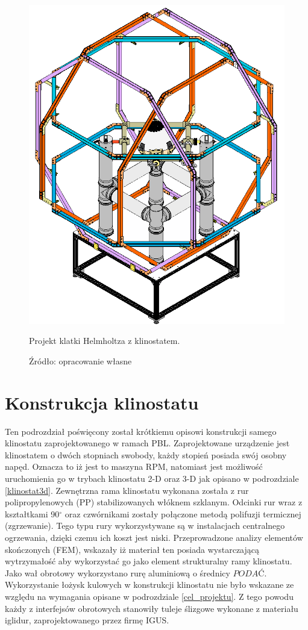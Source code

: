\begin{figure}
	\centering
	\includegraphics[scale=0.5]{klinostat_klatka}
	\caption{Projekt klatki Helmholtza z klinostatem.} 
	\caption*{Źródło: opracowanie własne}
	\label{fig:klatka_helmholtza}
\end{figure}

\section{Konstrukcja klinostatu}

Ten podrozdział poświęcony został krótkiemu opisowi konstrukcji samego klinostatu zaprojektowanego w ramach PBL. Zaprojektowane urządzenie jest klinostatem o dwóch stopniach swobody, każdy stopień posiada swój osobny napęd. Oznacza to iż jest to maszyna RPM, natomiast jest możliwość uruchomienia go w trybach klinostatu 2-D oraz 3-D jak opisano w podrozdziale \ref{klinostat3d}. Zewnętrzna rama klinostatu wykonana została z rur polipropylenowych (PP) stabilizowanych włóknem szklanym. Odcinki rur wraz z kształtkami 90$^\circ$ oraz czwórnikami zostały połączone metodą polifuzji termicznej (zgrzewanie). Tego typu rury wykorzystywane są w instalacjach centralnego ogrzewania, dzięki czemu ich koszt jest niski. Przeprowadzone analizy elementów skończonych (FEM), wskazały iż materiał ten posiada wystarczającą wytrzymałość aby wykorzystać go jako element strukturalny ramy klinostatu. Jako wał obrotowy wykorzystano rurę aluminiową o średnicy $PODAĆ$. Wykorzystanie łożysk kulowych w konstrukcji klinostatu nie było wskazane ze względu na wymagania opisane w podrozdziale \ref{cel_projektu}. Z tego powodu każdy z interfejsów obrotowych stanowiły tuleje ślizgowe wykonane z materiału iglidur, zaprojektowanego przez firmę IGUS.



